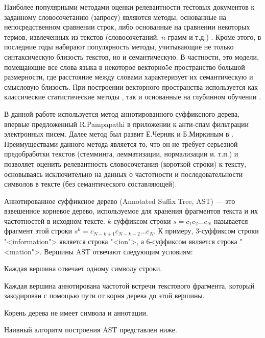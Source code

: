 \documentclass[12pt]{article}
\newenvironment{itemize*}%
{\begin{itemize}%
	\setlength{\itemsep}{0pt}%
	\setlength{\parskip}{0pt}}%
{\end{itemize}}
\begin{document}
Наиболее популярными методами оценки релевантности тестовых документов к заданному словосочетанию (запросу) являются методы, основанные на непосредственном сравнении строк, либо основанные на сравнении некоторых термов, извлеченных из текстов (словосочетаний, $n$-грамм и т.д.) \cite{gomaa2013survey}. Кроме этого, в последние годы набирают популярность методы, учитывающие не только синтаксическую близость текстов, но и семантическую. В частности, это модели, помещающие все слова языка в некоторое векторно5е пространство большой размерности, где расстояние между словами характеризует их семантическую и смысловую близость. При построении векторного пространства используется как классические статистические методы \cite{Erk_2012}, так и основанные на глубинном обучении \cite{li2018word}.

В данной работе используется метод аннотированного суффиксного дерева, впервые предложенный R.Pampapathi \cite{Pampapathi_2006} в приложении к анти-спам фильтрации электронных писем. Далее метод был развит Е.Черняк и Б.Миркиным в \cite{Chernyak_2015, Chernyak_Mirkin_2015}. Преимуществами данного метода является то, что он не требует серьезной предобработки текстов (стемминга, лемматизации, нормализации и. т.п.) и позволяет оценить релевантность словосочетания (короткой строки) к тексту, основываясь исключительно на данных о частотности и последовательности символов в тексте (без семантического составляющей).

Аннотированное суффиксное дерево (Annotated Suffix Tree, AST) --- это взвешенное корневое дерево, используемое для хранения фрагментов текста и их частотностей в исходном тексте. $k$-суффиксом строки $s=c_1c_2\ldots c_N$ называется фрагмент этой строки $s^k=c_{N-k+1}c_{N-k+2}\ldots c_{N}$. К примеру, 3-суффиксом строки "<information"> является строка "<ion">, а 6-суффиксом является строка "<mation">. Вершины AST отвечают следующим условиям:
\begin{itemize*}
	\item Каждая вершина отвечает одному символу строки.
	\item Каждая вершина аннотирована частотой встречи текстового фрагмента, который закодирован с помощью пути от корня дерева до этой вершины.
	\item Корень дерева не имеет символа и аннотации.
\end{itemize*}

Наивный алгоритм построения AST представлен ниже.
\end{document}
